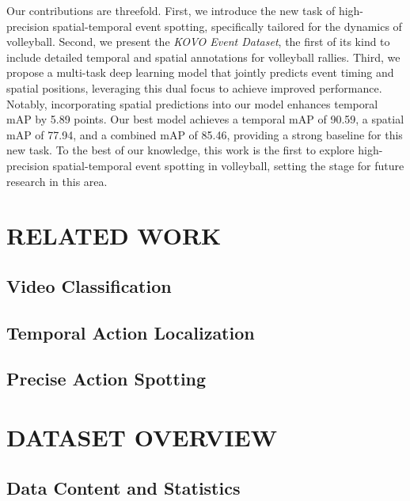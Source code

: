 \documentclass[a4paper,twoside]{article}
\begin{document}
Our contributions are threefold. First, we introduce the new task of high-precision spatial-temporal event spotting, specifically tailored for the dynamics of volleyball. Second, we present the \textit{KOVO Event Dataset}, the first of its kind to include detailed temporal and spatial annotations for volleyball rallies. Third, we propose a multi-task deep learning model that jointly predicts event timing and spatial positions, leveraging this dual focus to achieve improved performance. Notably, incorporating spatial predictions into our model enhances temporal mAP by 5.89 points. Our best model achieves a temporal mAP of 90.59, a spatial mAP of 77.94, and a combined mAP of 85.46, providing a strong baseline for this new task. To the best of our knowledge, this work is the first to explore high-precision spatial-temporal event spotting in volleyball, setting the stage for future research in this area.




\section{\uppercase{Related work}}

\subsection{Video Classification}


\subsection{Temporal Action Localization}


\subsection{Precise Action Spotting}


\section{\uppercase{DATASET OVERVIEW}}
\subsection{Data Content and Statistics}
\end{document}
